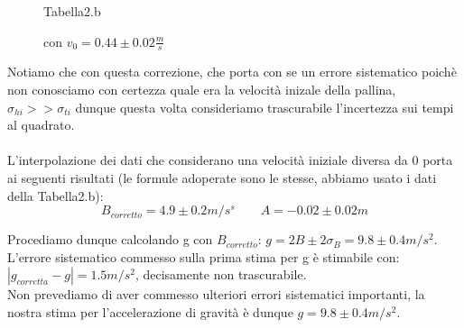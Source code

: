 \documentclass[a4paper]{article}
\theoremstyle{definition}
\begin{document}
\begin{figure}[!htbp]
	\captionsetup{labelformat=empty}
	\caption{Tabella2.b}
	\caption{con \(v_{0} = 0.44 \pm 0.02 \frac{m}{s}\)}
\end{figure}
\noindent Notiamo che con questa correzione, che porta con se un errore sistematico poichè non conosciamo con certezza quale era la velocità inizale della pallina, \(\sigma_{hi} >> \sigma_{ti}\) dunque questa volta consideriamo trascurabile l'incertezza sui tempi al quadrato.\\\\
\noindent L'interpolazione dei dati che considerano una velocità iniziale diversa da 0 porta ai seguenti risultati (le formule adoperate sono le stesse, abbiamo usato i dati della Tabella2.b):
\[B_{corretto}=4.9 \pm 0.2 m/s^{s} \qquad A=-0.02  \pm 0.02 m\]

\begin{figure}[!ht]
	\captionsetup{labelformat=empty}
\end{figure}

\noindent Procediamo dunque calcolando g con \(B_{corretto}\): \( g= 2B \pm 2\sigma_{B} = 9.8 \pm 0.4 m/s^{2}\). L'errore sistematico commesso sulla prima stima per g è stimabile con:\\ \(\left | g_{corretta} - g\right |=1.5 m/s^{2}\), decisamente non trascurabile.\\ 
\noindent Non prevediamo di aver commesso ulteriori errori sistematici importanti, la nostra stima per l'accelerazione di gravità è dunque \( g=9.8 \pm 0.4 m/s^{2}\).\\\\

\end{document}
